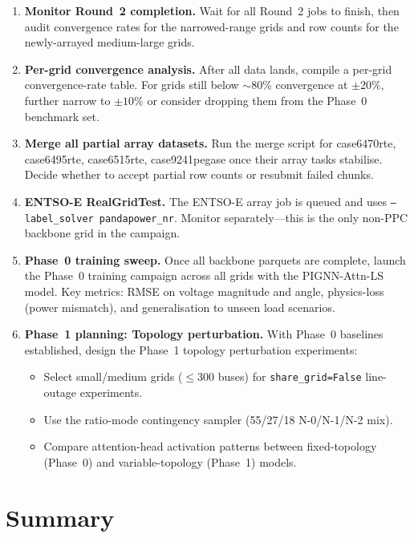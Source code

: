 \documentclass{article}
\begin{document}
\begin{enumerate}[leftmargin=*]
\item \textbf{Monitor Round~2 completion.}
  Wait for all Round~2 jobs to finish, then audit convergence rates for the
  narrowed-range grids and row counts for the newly-arrayed medium-large grids.

\item \textbf{Per-grid convergence analysis.}
  After all data lands, compile a per-grid convergence-rate table.
  For grids still below $\sim$80\% convergence at $\pm20\%$, further narrow
  to $\pm10\%$ or consider dropping them from the Phase~0 benchmark set.

\item \textbf{Merge all partial array datasets.}
  Run the merge script for case6470rte, case6495rte, case6515rte,
  case9241pegase once their array tasks stabilise.  Decide whether to
  accept partial row counts or resubmit failed chunks.

\item \textbf{ENTSO-E RealGridTest.}
  The ENTSO-E array job is queued and uses \texttt{--label\_solver
  pandapower\_nr}. Monitor separately---this is the only non-PPC
  backbone grid in the campaign.

\item \textbf{Phase~0 training sweep.}
  Once all backbone parquets are complete, launch the Phase~0 training
  campaign across all grids with the PIGNN-Attn-LS model.
  Key metrics: RMSE on voltage magnitude and angle, physics-loss
  (power mismatch), and generalisation to unseen load scenarios.

\item \textbf{Phase~1 planning: Topology perturbation.}
  With Phase~0 baselines established, design the Phase~1 topology
  perturbation experiments:
  \begin{itemize}
    \item Select small/medium grids ($\leq$300 buses) for
      \texttt{share\_grid=False} line-outage experiments.
    \item Use the ratio-mode contingency sampler (55/27/18 N-0/N-1/N-2 mix).
    \item Compare attention-head activation patterns between
      fixed-topology (Phase~0) and variable-topology (Phase~1) models.
  \end{itemize}
\end{enumerate}


\section{Summary}
\end{document}
